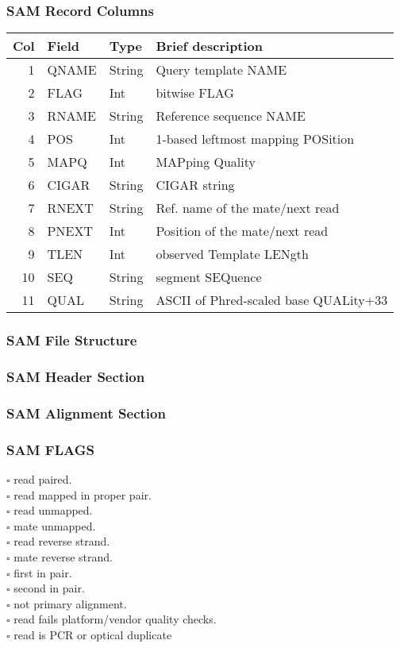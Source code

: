 \documentclass{beamer}
\begin{document}
\begin{frame}[fragile]
\frametitle{SAM Record Columns}
\begin{center}
\small
\begin{tabular}{rlll}
  \hline
  {\bf Col} & {\bf Field} & {\bf Type} & {\bf Brief description} \\
  \hline
  1 & {\sf QNAME} & String & Query template NAME\\
  2 & {\sf FLAG} & Int & bitwise FLAG \\
  3 & {\sf RNAME} & String & Reference sequence NAME\\
  4 & {\sf POS} & Int & 1-based leftmost mapping POSition \\
  5 & {\sf MAPQ} & Int & MAPping Quality \\
  6 & {\sf CIGAR} & String & CIGAR string \\
  7 & {\sf RNEXT} & String & Ref. name of the mate/next read\\
  8 & {\sf PNEXT} & Int & Position of the mate/next read \\
  9 & {\sf TLEN} & Int & observed Template LENgth \\
  10 & {\sf SEQ} & String & segment SEQuence\\
  11 & {\sf QUAL} & String & ASCII of Phred-scaled base QUALity+33 \\
  \hline
\end{tabular}
\end{center}
\end{frame}



\begin{frame} 
\frametitle{SAM File Structure}

\end{frame}

\begin{frame} 
\frametitle{SAM Header Section}
\end{frame}

\begin{frame} 
\frametitle{SAM Alignment Section}
\end{frame}



\begin{frame} 
\frametitle{SAM FLAGS}
$\square$ read paired.\\
$\square$ read mapped in proper pair.\\
$\square$ read unmapped.\\
$\square$ mate unmapped.\\
$\square$ read reverse strand.\\
$\square$ mate reverse strand.\\
$\square$ first in pair.\\
$\square$ second in pair.\\
$\square$ not primary alignment.\\
$\square$ read fails platform/vendor quality checks.\\
$\square$ read is PCR or optical duplicate
\end{frame}
\end{document}
